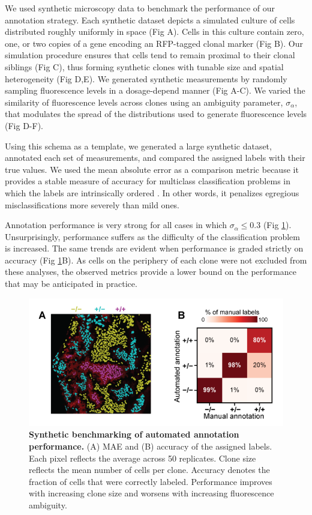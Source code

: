 \documentclass[10pt,letterpaper]{article}
\begin{document}
We used synthetic microscopy data to benchmark the performance of our annotation strategy. Each synthetic dataset depicts a simulated culture of cells distributed roughly uniformly in space (Fig A). Cells in this culture contain zero, one, or two copies of a gene encoding an RFP-tagged clonal marker (Fig B). Our simulation procedure ensures that cells tend to remain proximal to their clonal siblings (Fig C), thus forming synthetic clones with tunable size and spatial heterogeneity (Fig D,E). We generated synthetic measurements by randomly sampling fluorescence levels in a dosage-depend manner (Fig A-C). We varied the similarity of fluorescence levels across clones using an ambiguity parameter, $\sigma_{\alpha}$, that modulates the spread of the distributions used to generate fluorescence levels (Fig D-F). 

Using this schema as a template, we generated a large synthetic dataset, annotated each set of measurements, and compared the assigned labels with their true values. We used the mean absolute error as a comparison metric because it provides a stable measure of accuracy for multiclass classification problems in which the labels are intrinsically ordered \cite{Gaudette2009}. In other words, it penalizes egregious misclassifications more severely than mild ones.

Annotation performance is very strong for all cases in which $\sigma_{\alpha} \leq 0.3$ (Fig \ref{fig4}). Unsurprisingly, performance suffers as the difficulty of the classification problem is increased. The same trends are evident when performance is graded strictly on accuracy (Fig \ref{fig4}B). As cells on the periphery of each clone were not excluded from these analyses, the observed metrics provide a lower bound on the performance that may be anticipated in practice.

\begin{figure}[t]
\centering
\includegraphics[scale=1.0]{./figure_4}
\caption{\textbf{Synthetic benchmarking of automated annotation performance.} (A) MAE and (B) accuracy of the assigned labels. Each pixel reflects the average across 50 replicates. Clone size reflects the mean number of cells per clone. Accuracy denotes the fraction of cells that were correctly labeled. Performance improves with increasing clone size and worsens with increasing fluorescence ambiguity.}
\label{fig4}
\end{figure}
\end{document}
